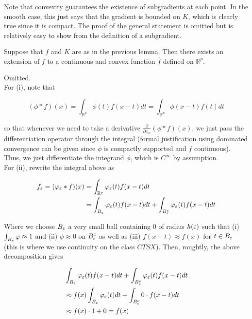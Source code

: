 \documentclass[11pt,reqno]{amsart}
\numberwithin{equation}{section}
\newcommand{\mr}{\mathbb{R}}
\newcommand{\ov}{\overline}
\newcommand{\pa}{\partial}
\begin{document}
\proof Note that convexity guarantees the existence of subgradients at each point. In the smooth case, this just says that the gradient is bounded on $K$, which is clearly true since it is compact. The proof of the general statement is omitted but is relatively easy to show from the definition of a subgradient. \\

\begin{lemma} \label{cts-convex-extension}
Suppose that $f$ and $K$ are as in the previous lemma. Then there exists an extension of $f$ to a continuous and convex function $\ov{f}$ defined on $\mr^p$. 
\end{lemma}

\proof Omitted. \\

For (i), note that 

\begin{equation} \label{conv-def}
(\phi \ast f)(x) = \int_{\mr^p} \phi(t) f(x - t) dt = \int_{\mr^p} \phi(x - t) f(t) dt 
\end{equation}

so that whenever we need to take a derivative $\frac{\pa}{\pa x_{\alpha}} (\phi \ast f)(x)$, we just pass the differentiation operator through the integral (formal justification using dominated convergence can be given since $\phi$ is compactly supported and $f$ continuous). Thus, we just differentiate the integrand $\phi$, which is $C^{\infty}$ by assumption. \\

For (ii), rewrite the integral above as 

\begin{equation} \label{conv2}
\begin{aligned}
f_{\eps} = (\phi_{\eps} \ast f)(x) &= \int_{\mr^p} \phi_{\eps}(t) f(x - t) dt\\
&=\int_{B_{\eps}} \phi_{\eps}(t) f(x - t) dt + \int_{B_{\eps}^c} \phi_{\eps}(t) f(x - t) dt
\end{aligned}
\end{equation}

Where we choose $B_{\varepsilon}$ a very small ball containing $0$ of radius $h(\varepsilon)$ such that (i) $\int_{B_{\varepsilon}} \varphi \approx 1$ and (ii) $\phi \approx 0 $ on $B_{\varepsilon}^c$ as well as (iii) $f(x-t) \approx f(x)$ for $t \in B_{\varepsilon}$ (this is where we use continuity on the class $CTSX$). Then, roughtly, the above decomposition gives 

\begin{equation} \label{conv3}
\begin{aligned}
&\int_{B_{\varepsilon}} \varphi_{\varepsilon}(t) f(x - t) dt + \int_{B_{\varepsilon}^c} \varphi_{\varepsilon}(t) f(x - t) dt\\
&\approx f(x) \int_{B_{\varepsilon}} \varphi_{\varepsilon}(t) dt + \int_{B_{\varepsilon}^c} 0 \cdot f(x -t) dt \\
&\approx f(x) \cdot 1 + 0 = f(x)
\end{aligned}
\end{equation}
\end{document}
